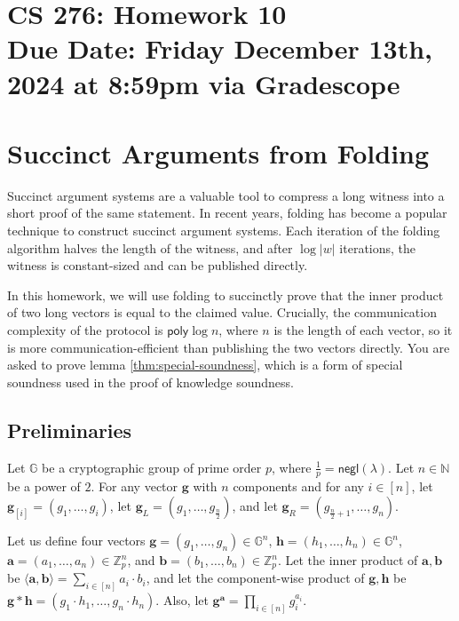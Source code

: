 \documentclass[11pt]{article}
\numberwithin{equation}{section}
\newcommand{\bfa}{\mathbf{a}}
\newcommand{\bfb}{\mathbf{b}}
\newcommand{\bfg}{\mathbf{g}}
\newcommand{\bfh}{\mathbf{h}}
\newcommand{\bbG}{\mathbb{G}}
\newcommand{\bbN}{\mathbb{N}}
\newcommand{\bbZ}{\mathbb{Z}}
\newcommand{\secp}{\lambda}
\newcommand{\negl}{\mathsf{negl}}
\newcommand{\poly}{\mathsf{poly}}
\newcommand{\duedate}{Friday December 13th, 2024 at 8:59pm via Gradescope}
\begin{document}
\section*{CS 276: Homework 10\\ {\small Due Date: \duedate} }

\section{Succinct Arguments from Folding}
Succinct argument systems are a valuable tool to compress a long witness into a short proof of the same statement. In recent years, folding has become a popular technique to construct succinct argument systems. Each iteration of the folding algorithm halves the length of the witness, and after $\log |w|$ iterations, the witness is constant-sized and can be published directly. 

In this homework, we will use folding to succinctly prove that the inner product of two long vectors is equal to the claimed value. Crucially, the communication complexity of the protocol is $\poly \log n$, where $n$ is the length of each vector, so it is more communication-efficient than publishing the two vectors directly. You are asked to prove lemma \ref{thm:special-soundness}, which is a form of special soundness used in the proof of knowledge soundness.

\subsection{Preliminaries}
Let $\bbG$ be a cryptographic group of prime order $p$, where $\frac{1}{p} = \negl(\secp)$. Let $n \in \bbN$ be a power of $2$. For any vector $\bfg$ with $n$ components and for any $i \in [n]$, let $\bfg_{[i]} = (g_1, \dots, g_i)$, let $\bfg_L = (g_1, \dots, g_{\frac{n}{2}})$, and let $\bfg_R = (g_{\frac{n}{2}+1}, \dots, g_n)$. 

Let us define four vectors $\bfg = (g_1, \dots, g_{n}) \in \bbG^{n}$, $\bfh = (h_1, \dots, h_{n}) \in \bbG^{n}$, $\bfa = (a_1, \dots, a_n) \in \bbZ_p^{n}$, and $\bfb = (b_1, \dots, b_n) \in \bbZ_p^{n}$. Let the inner product of $\bfa, \bfb$ be $\langle \bfa, \bfb\rangle = \sum_{i \in [n]} a_i \cdot b_i$, and let the component-wise product of $\bfg, \bfh$ be $\bfg * \bfh = (g_1 \cdot h_1, \dots, g_n \cdot h_n)$. Also, let $\bfg^\bfa = \prod_{i \in [n]} g_i^{a_i}$.
\end{document}
